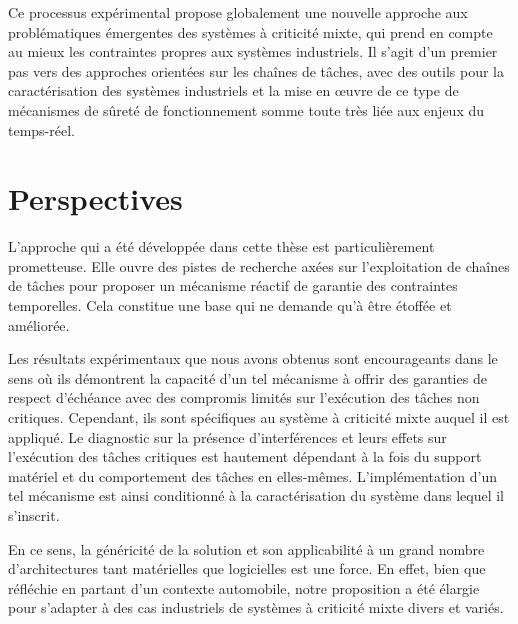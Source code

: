 \documentclass[a4paper,11pt,twoside]{StyleThese}
\begin{document}
Ce processus expérimental propose globalement une nouvelle approche aux problématiques émergentes des systèmes à criticité mixte, qui prend en compte au mieux les contraintes propres aux systèmes industriels. Il s'agit d'un premier pas vers des approches orientées sur les chaînes de tâches, avec des outils pour la caractérisation des systèmes industriels et la mise en œuvre de ce type de mécanismes de sûreté de fonctionnement somme toute très liée aux enjeux du temps-réel.


\section*{Perspectives}


L'approche qui a été développée dans cette thèse est particulièrement prometteuse. Elle ouvre des pistes de recherche axées sur l'exploitation de chaînes de tâches pour proposer un mécanisme réactif de garantie des contraintes temporelles. Cela constitue une base qui ne demande qu'à être étoffée et améliorée.

Les résultats expérimentaux que nous avons obtenus sont encourageants dans le sens où ils démontrent la capacité d'un tel mécanisme à offrir des garanties de respect d'échéance avec des compromis limités sur l'exécution des tâches non critiques. Cependant, ils sont spécifiques au système à criticité mixte auquel il est appliqué. Le diagnostic sur la présence d'interférences et leurs effets sur l'exécution des tâches critiques est hautement dépendant à la fois du support matériel et du comportement des tâches en elles-mêmes. L'implémentation d'un tel mécanisme est ainsi conditionné à la caractérisation du système dans lequel il s'inscrit.
 
En ce sens, la généricité de la solution et son applicabilité à un grand nombre d'architectures tant matérielles que logicielles est une force. En effet, bien que réfléchie en partant d'un contexte automobile, notre proposition a été élargie pour s'adapter à des cas industriels de systèmes à criticité mixte divers et variés. 
\end{document}
